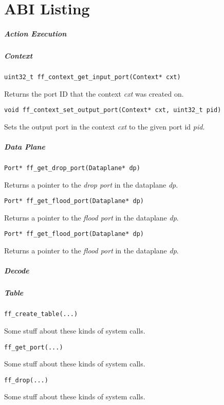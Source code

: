 \chapter{ABI Listing}
\label{abi-listing}

\paragraph{Action Execution}



\paragraph{Context}

\begin{lstlisting}
uint32_t ff_context_get_input_port(Context* cxt)
\end{lstlisting}
Returns the port ID that the context \emph{cxt} was created on.


\begin{lstlisting}
void ff_context_set_output_port(Context* cxt, uint32_t pid)
\end{lstlisting}
Sets the output port in the context \emph{cxt} to the given port id \emph{pid}.

\paragraph{Data Plane}

\begin{lstlisting}
Port* ff_get_drop_port(Dataplane* dp)
\end{lstlisting}
Returns a pointer to the \emph{drop port} in the dataplane \emph{dp}.


\begin{lstlisting}
Port* ff_get_flood_port(Dataplane* dp)
\end{lstlisting}
Returns a pointer to the \emph{flood port} in the dataplane \emph{dp}.

\begin{lstlisting}
Port* ff_get_flood_port(Dataplane* dp)
\end{lstlisting}
Returns a pointer to the \emph{flood port} in the dataplane \emph{dp}.

\paragraph{Decode}

\paragraph{Table}



\begin{lstlisting}
ff_create_table(...)
\end{lstlisting}
Some stuff about these kinds of system calls.

\begin{lstlisting}
ff_get_port(...)
\end{lstlisting}
Some stuff about these kinds of system calls.

\begin{lstlisting}
ff_drop(...)
\end{lstlisting}
Some stuff about these kinds of system calls.
